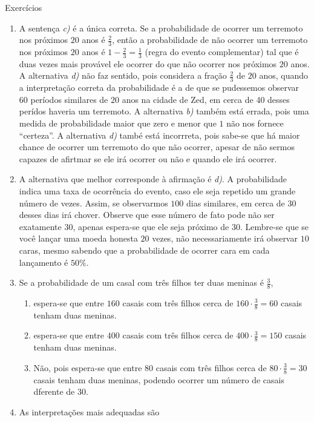 \begin{answer}{Exercícios}
{\exerciselist
\begin{enumerate}
\item A sentença \textit{c)} é a única correta. Se a probabilidade de ocorrer um terremoto nos próximos $20$ anos é $\frac{2}{3}$, então a probabilidade de não ocorrer um terremoto nos próximos $20$ anos é $1-\frac{2}{3}=\frac{1}{3}$ (regra do evento complementar) tal que é duas vezes mais provável ele ocorrer do que não ocorrer nos próximos $20$ anos. A alternativa \textit{d)} não faz sentido, pois considera a fração $\frac{2}{3}$ de $20$ anos, quando a interpretação correta da probabilidade é a de que se pudessemos observar 60 períodos similares de $20$ anos na cidade de Zed, em cerca de 40 desses perídos haveria um terremoto. A alternativa \textit{b)} também está errada, pois uma medida de probabilidade maior que zero e menor que $1$ não nos fornece “certeza”. A alternativa \textit{d)} també está incorrreta, pois sabe-se que há maior chance de ocorrer um terremoto do que não ocorrer, apesar de não sermos capazes de afirtmar se ele irá ocorrer ou não e quando ele irá ocorrer.

\item A alternativa que melhor corresponde à afirmação é \textit{d)}. A probabilidade indica uma taxa de ocorrência do evento, caso ele seja repetido um grande número de vezes. Assim, se observarmos $100$ dias similares, em cerca de $30$ desses dias irá chover. Observe que esse número de fato pode não ser exatamente $30$, apenas espera-se que ele seja próximo de $30$. Lembre-se que se você lançar uma moeda honesta $20$ vezes, não necessariamente irá observar $10$ caras, mesmo sabendo que a probabilidade de ocorrer cara em cada lançamento é $50\%$.

\item Se a probabilidade de um casal com três filhos ter duas meninas é $\frac{3}{8}$,
\begin{enumerate}
\item espera-se que entre $160$ casais com três filhos cerca de $160\cdot\frac{3}{8}=60$ casais tenham duas meninas.

\item espera-se que entre $400$ casais com três filhos cerca de $400\cdot\frac{3}{8}=150$ casais tenham duas meninas.

\item Não, pois espera-se que entre $80$ casais com três filhos cerca de $80\cdot\frac{3}{8}=30$ casais tenham duas meninas, podendo ocorrer um número de casais dferente de $30$.
\end{enumerate}
\item As interpretações mais adequadas são


\end{enumerate}}
\end{answer}
